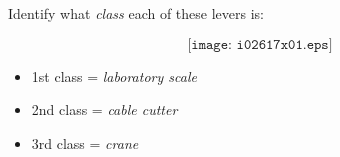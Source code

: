 

Identify what {\it class} each of these levers is:

$$\texttt{[image: i02617x01.eps]}$$







\begin{itemize}
\item{} 1st class = {\it laboratory scale}
\item{} 2nd class = {\it cable cutter}
\item{} 3rd class = {\it crane}
\end{itemize}












